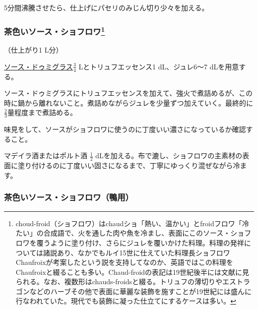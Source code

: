 \begin{recette}
5分間沸騰させたら、仕上げにパセリのみじん切り少々を加える。

\hypertarget{sauce-chaud-froid-brune}{%
\subsubsection[茶色いソース・ショフロワ]{\texorpdfstring{茶色いソース・ショフロワ\footnote{choud-froid（ショフロワ）はchaudショ「熱い、温かい」とfroidフロワ「冷たい」の合成語で、火を通した肉や魚を冷まし、表面にこのソース・ショフロワを覆うように塗り付け、さらにジュレを覆いかけた料理。料理の発祥については諸説あり、なかでもルイ15世に仕えていた料理長ショフロワChaufroixが考案したという説を支持してなのか、英語ではこの料理をChaufroixと綴ることも多い。Chaud-froidの表記は19世紀後半には文献に見られる。なお、複数形はchauds-froidsと綴る。トリュフの薄切りやエストラゴンなどのハーブその他で表面に華麗な装飾を施すことが19世紀には盛んに行なわれていた。現代でも装飾に凝った仕立てにするケースは多い。}}{茶色いソース・ショフロワ}}\label{sauce-chaud-froid-brune}}



（仕上がり1 L分）

\protect\hyperlink{sauce-demi-glace}{ソース・ドゥミグラス}\(\frac{3}{4}\)
Lとトリュフエッセンス1 dL、ジュレ6〜7 dLを用意する。

ソース・ドゥミグラスにトリュフエッセンスを加えて、強火で煮詰めるが、この時に鍋から離れないこと。煮詰めながらジュレを少量ずつ加えていく。最終的に\(\frac{2}{3}\)量程度まで煮詰める。

味見をして、ソースがショフロワに使うのに丁度いい濃さになっているか確認すること。

マデイラ酒またはポルト酒 \(\frac{1}{2}\)
dLを加える。布で漉し、ショフロワの主素材の表面に塗り付けるのに丁度いい固さになるまで、丁寧にゆっくり混ぜながら冷ます。

\hypertarget{sauce-chaud-froid-brune-pour-canards}{%
\subsubsection{茶色いソース・ショフロワ（鴨用）}\label{sauce-chaud-froid-brune-pour-canards}}



\end{recette}
